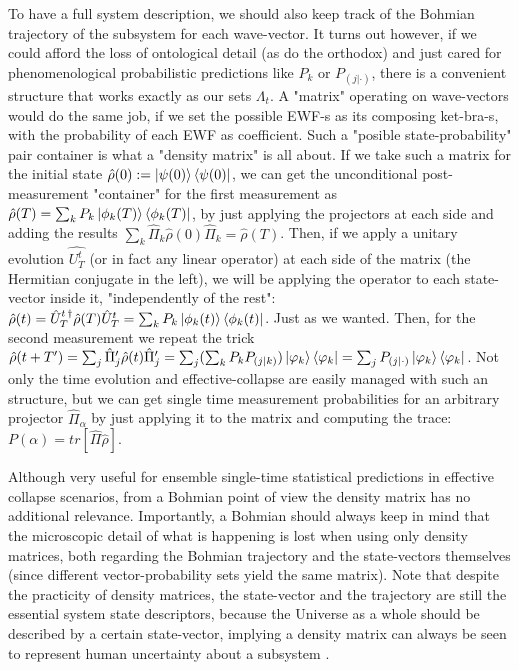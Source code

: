 \documentclass[11pt, a4paper]{article} %
\begin{document}
To have a full system description, we should also keep track of the Bohmian trajectory of the subsystem for each wave-vector. It turns out however, if we could afford the loss of ontological detail (as do the orthodox) and just cared for phenomenological probabilistic predictions like $P_k$ or $P_{(j|\cdot)}$, there is a convenient structure that works exactly as our sets $\Lambda_t$. A "matrix" operating on wave-vectors would do the same job, if we set the possible EWF-s as its composing ket-bra-s, with the probability of each EWF as coefficient. Such a "posible state-probability" pair container is what a "density matrix" \cite{vonNeumann, Durr, Holland} is all about. 
If we take such a matrix for the initial state $\hat{\rho}(0):=\ket{\psi(0)}\bra{\psi(0)}$, we can get the unconditional post-measurement "container" for the first measurement as $\hat{\rho}(T)=\sum_k P_k\ket{\phi_k(T)}\bra{\phi_k(T)}$, by just applying the projectors at each side and adding the results $\sum_k\hat{\Pi}_k \hat{\rho}(0) \hat{\Pi}_k=\hat{\rho}(T)$. Then, if we apply a unitary evolution $\hat{U_T^t}$ (or in fact any linear operator) at each side of the matrix (the Hermitian conjugate in the left), we will be applying the operator to each state-vector inside it, "independently of the rest": $\hat{\rho}(t)=\hat{U}_T^{t\,\dagger}\hat{\rho}(T)\hat{U}_T^{t}=\sum_k P_k\ket{\phi_k(t)}\bra{\phi_k(t)}$. Just as we wanted. Then, for the second measurement we repeat the trick $\hat{\rho}(t+T')=\sum_j\hat{\Pi}'_j \hat{\rho}(t) \hat{\Pi}'_j=\sum_j (\sum_k P_kP_{(j|k)})\ket{\varphi_k}\bra{\varphi_k}=\sum_j P_{(j|\cdot)}\ket{\varphi_k}\bra{\varphi_k}$. Not only the time evolution and effective-collapse are easily managed with such an structure, but we can get single time measurement probabilities for an arbitrary projector $\hat{\Pi}_\alpha$ by just applying it to the matrix and computing the trace: $P(\alpha)=tr[\hat{\Pi}\hat{\rho}]$.

Although very useful for ensemble single-time statistical predictions in effective collapse scenarios, from a Bohmian point of view the density matrix has no additional relevance. Importantly, a Bohmian should always keep in mind that the microscopic detail of what is happening is lost when using only density matrices, both regarding the Bohmian trajectory and the state-vectors themselves (since different vector-probability sets yield the same matrix). Note that despite the practicity of density matrices, the state-vector and the trajectory are still the essential system state descriptors, because the Universe as a whole should be described by a certain state-vector, implying a density matrix can always be seen to represent human uncertainty about a subsystem \cite{Generalized}.\vspace{-0.2cm}
\end{document}
